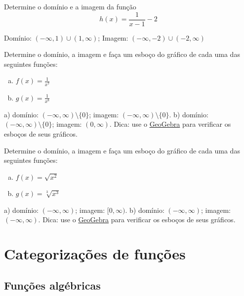 \documentclass[../main.tex]{subfiles}
\begin{document}
\begin{exer}
  Determine o domínio e a imagem da função
  \begin{equation*}
    h(x) = \frac{1}{x-1} - 2
  \end{equation*}
\end{exer}
\begin{resp}
  Domínio: $(-\infty, 1)\cup (1, \infty)$; Imagem: $(-\infty, -2)\cup (-2, \infty)$
\end{resp}
\begin{exer}
  Determine o domínio, a imagem e faça um esboço do gráfico de cada uma das seguintes funções:
  \begin{enumerate}[a)]
  \item $\displaystyle f(x) = \frac{1}{x^7}$
  \item $\displaystyle g(x) = \frac{1}{x^8}$
  \end{enumerate}
\end{exer}
\begin{resp}
  a) domínio: $(-\infty, \infty)\setminus\{0\}$; imagem: $(-\infty, \infty)\setminus\{0\}$. b) domínio: $(-\infty, \infty)\setminus\{0\}$; imagem: $(0, \infty)$. Dica: use o \href{https://www.geogebra.org/graphing}{GeoGebra} para verificar os esboços de seus gráficos.
\end{resp}

\begin{exer}
  Determine o domínio, a imagem e faça um esboço do gráfico de cada uma das seguintes funções:
  \begin{enumerate}[a)]
  \item $\displaystyle f(x) = \sqrt{x^2}$
  \item $\displaystyle g(x) = \sqrt[3]{x^3}$
  \end{enumerate}
\end{exer}
\begin{resp}
  a) domínio: $(-\infty, \infty)$; imagem: $[0, \infty)$. b) domínio: $(-\infty, \infty)$; imagem: $(-\infty, \infty)$. Dica: use o \href{https://www.geogebra.org/graphing}{GeoGebra} para verificar os esboços de seus gráficos.
\end{resp}

\section{Categorizações de funções}
\subsection{Funções algébricas}
\end{document}
